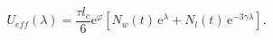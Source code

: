 \begin{equation}
U_{eff}(\lambda)
   = \frac{\tau l_c}{6}
     \mathrm{e}^\varphi
     \left[ N_w(t)\, \mathrm{e}^\lambda
           +N_l(t)\, \mathrm{e}^{-3\gamma\lambda}
     \right].
\end{equation}

